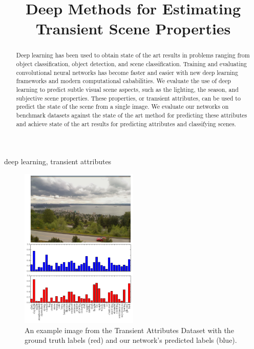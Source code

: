 \documentclass{article}
\title{Deep Methods for Estimating Transient Scene Properties}
\begin{document}
%
\maketitle
%
\begin{abstract}
	
	Deep learning has been used to obtain state of the art results in
  problems ranging from object classification, object detection, and
  scene classification.  Training and evaluating convolutional neural
	networks has become faster and easier with new deep learning 
	frameworks and modern computational cababilities.  We evaluate the 
	use of deep learning to predict subtle visual scene aspects, such as
	the lighting, the season, and subjective scene properties. These
	properties, or transient attributes, can be used to predict the 
	state of the scene from a single image.  We evaluate our networks
	on benchmark datasets against the state of the art method for 
	predicting these attributes and achieve state of the art results for 
	predicting attributes and classifying scenes.

\end{abstract}
%
\begin{keywords}
	deep learning, transient attributes
\end{keywords}

\begin{figure}[t!]
	\centering
		\includegraphics[width=0.5\textwidth]{figs/bars.pdf}
		\caption{An example image from the Transient Attributes Dataset with the ground truth labels
						 (red) and our network's predicted labels (blue).}\label{fig:sort}
\end{figure}
\end{document}
